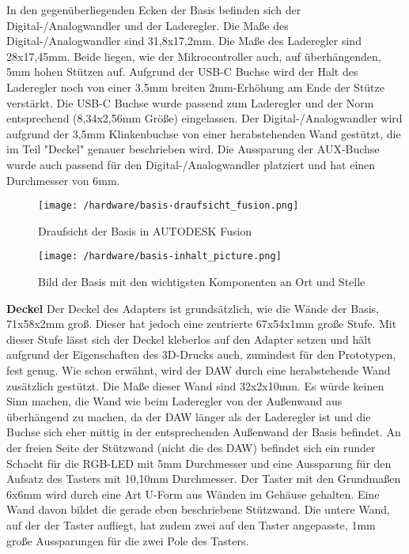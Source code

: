 \documentclass[]{article}
\begin{document}
In den gegenüberliegenden Ecken der Basis befinden sich der Digital-/Analogwandler und der Laderegler. Die Maße des Digital-/Analogwandler sind 31,8x17,2mm. Die Maße des Laderegler sind 28x17,45mm. Beide liegen, wie der Mikrocontroller auch, auf überhängenden, 5mm hohen Stützen auf. Aufgrund der USB-C Buchse wird der Halt des Laderegler noch von einer 3,5mm breiten 2mm-Erhöhung am Ende der Stütze verstärkt. Die USB-C Buchse wurde passend zum Laderegler und der Norm entsprechend (8,34x2,56mm Größe) eingelassen. Der Digital-/Analogwandler wird aufgrund der 3,5mm Klinkenbuchse von einer herabstehenden Wand gestützt, die im Teil "Deckel" genauer beschrieben wird. Die Aussparung der AUX-Buchse wurde auch passend für den Digital-/Analogwandler platziert und hat einen Durchmesser von 6mm.\newline
\begin{figure}[H]
\begin{flushleft}
\texttt{[image: /hardware/basis-draufsicht\_fusion.png]}
\caption{Draufsicht der Basis in AUTODESK Fusion}
\end{flushleft}
\end{figure}
\begin{figure}[H]
\begin{flushleft}
\texttt{[image: /hardware/basis-inhalt\_picture.png]}
\caption{Bild der Basis mit den wichtigsten Komponenten an Ort und Stelle}
\end{flushleft}
\end{figure}
\vspace{4mm}
\textbf{Deckel} \newline
Der Deckel des Adapters ist grundsätzlich, wie die Wände der Basis, 71x58x2mm groß. Dieser hat jedoch eine zentrierte 67x54x1mm große Stufe. Mit dieser Stufe lässt sich der Deckel kleberlos auf den Adapter setzen und hält aufgrund der Eigenschaften des 3D-Drucks auch, zumindest für den Prototypen, fest genug.
Wie schon erwähnt, wird der DAW durch eine herabstehende Wand zusätzlich gestützt. Die Maße dieser Wand sind 32x2x10mm. Es würde keinen Sinn machen, die Wand wie beim Laderegler von der Außenwand aus überhängend zu machen, da der DAW länger als der Laderegler ist und die Buchse sich eher mittig in der entsprechenden Außenwand der Basis befindet.\newline
An der freien Seite der Stützwand (nicht die des DAW) befindet sich ein runder Schacht für die RGB-LED mit 5mm Durchmesser und eine Aussparung für den Aufsatz des Tasters mit 10,10mm Durchmesser. Der Taster mit den Grundmaßen 6x6mm wird durch eine Art U-Form aus Wänden im Gehäuse gehalten. Eine Wand davon bildet die gerade eben beschriebene Stützwand. Die untere Wand, auf der der Taster aufliegt, hat zudem zwei auf den Taster angepasste, 1mm große Aussparungen für die zwei Pole des Tasters.\newline
\end{document}
